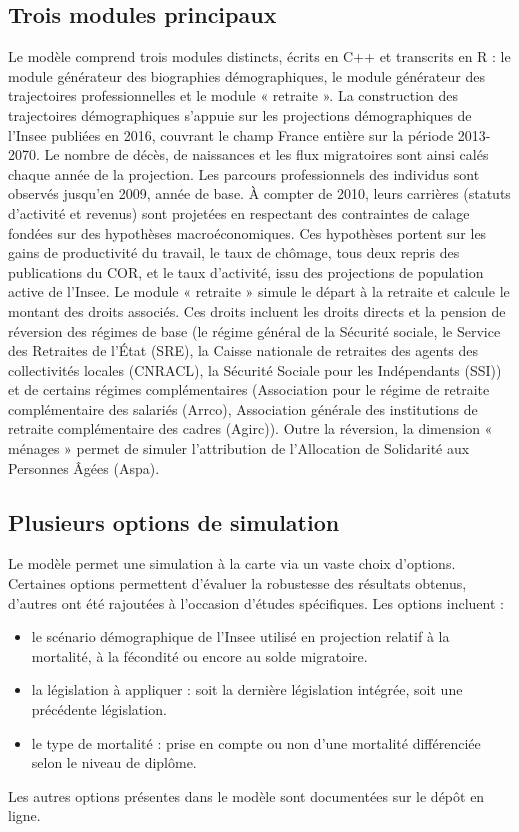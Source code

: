 \subsection*{Trois modules principaux}
Le modèle comprend trois modules distincts, écrits en C++ et transcrits en R : le module générateur des biographies démographiques, le module générateur des trajectoires professionnelles et le module «  retraite ».
La construction des trajectoires démographiques s’appuie sur les projections démographiques de l’Insee publiées en 2016, couvrant le champ France entière sur la période 2013-2070. Le nombre de décès, de naissances et les flux migratoires sont ainsi calés chaque année de la projection. 
Les parcours professionnels des individus sont observés jusqu’en 2009, année de base. À compter de 2010, leurs carrières (statuts d’activité et revenus) sont projetées en respectant des contraintes de calage fondées sur des hypothèses macroéconomiques. Ces hypothèses portent sur les gains de productivité du travail, le taux de chômage, tous deux repris des publications du COR, et le taux d’activité, issu des projections de population active de l’Insee.
Le module « retraite » simule le départ à la retraite et calcule le montant des droits associés. Ces droits incluent les droits directs et la pension de réversion des régimes de base (le régime général de la Sécurité sociale, le Service des Retraites de l’État (SRE), la Caisse nationale de retraites des agents des collectivités locales (CNRACL), la Sécurité Sociale pour les Indépendants (SSI)) et de certains régimes complémentaires (Association pour le régime de retraite complémentaire des salariés (Arrco), Association générale des institutions de retraite complémentaire des cadres (Agirc)). Outre la réversion, la dimension « ménages » permet de simuler l’attribution de l’Allocation de Solidarité aux Personnes Âgées (Aspa).
\subsection*{Plusieurs options de simulation}
Le modèle permet une simulation à la carte via un vaste choix d'options. Certaines options permettent d’évaluer la robustesse des résultats obtenus, d'autres ont été rajoutées à l’occasion d’études spécifiques. Les options incluent :
\begin{itemize}
    \item le scénario démographique de l’Insee utilisé en projection relatif à la mortalité, à la fécondité ou encore au solde migratoire.
    \item la législation à appliquer : soit la dernière législation intégrée, soit une précédente législation.
    \item le type de mortalité : prise en compte ou non d'une mortalité différenciée selon le niveau de diplôme.
\end{itemize}    
Les autres options présentes dans le modèle sont documentées sur le dépôt en ligne.


